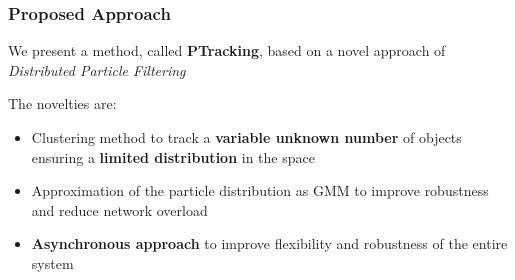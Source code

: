 \begin{frame}
\begin{columns}[t]
		\vspace{0.5cm}
		
		{
		}
	\end{columns}
	
\end{frame}

\begin{frame}
	\frametitle{Proposed Approach}
	
	\Large
	
	\vspace{0.25cm}
	
	We present a method, called \textbf{PTracking}, based on a novel approach of
	\emph{Distributed Particle Filtering}
	
	\vspace{0.2cm}
	
	The novelties are:
	\vspace{-0.1cm}
	
	\begin{itemize}
		\item Clustering method to track a \textbf{variable unknown number} of objects ensuring
			  a \textbf{limited distribution} in the space
		\vspace{0.1cm}
		\item Approximation of the particle distribution as GMM to improve robustness and
			  reduce network overload
		\vspace{0.1cm}
		\item \textbf{Asynchronous approach} to improve flexibility and robustness of the
			  entire system
	\end{itemize}
\end{frame}

